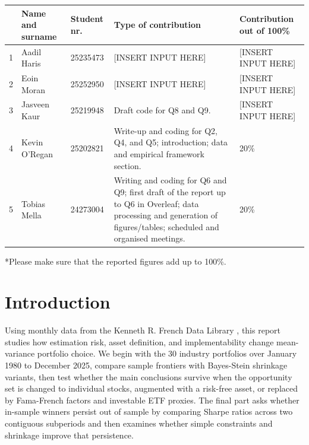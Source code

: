 \documentclass[11pt,a4paper]{article}
\begin{document}
\renewcommand{\arraystretch}{1.35}
\small
\begin{tabular}{|c|p{3.1cm}|p{2.2cm}|p{6.0cm}|p{2.3cm}|}
\hline
& \textbf{Name and surname} & \textbf{Student nr.} & \textbf{Type of contribution} & \textbf{Contribution out of 100\%} \\ \hline
1 & Aadil Haris & 25235473 & [INSERT INPUT HERE] & [INSERT INPUT HERE] \\ \hline
2 & Eoin Moran & 25252950 & [INSERT INPUT HERE] & [INSERT INPUT HERE] \\ \hline
3 & Jasveen Kaur & 25219948 & Draft code for Q8 and Q9. & [INSERT INPUT HERE] \\ \hline
4 & Kevin O'Regan & 25202821 & Write-up and coding for Q2, Q4, and Q5; introduction; data and empirical framework section. & 20\% \\ \hline
5 & Tobias Mella & 24273004 & Writing and coding for Q6 and Q9; first draft of the report up to Q6 in Overleaf; data processing and generation of figures/tables; scheduled and organised meetings. & 20\% \\ \hline
\end{tabular}

\vspace{0.5em}

\noindent
\footnotesize{*Please make sure that the reported figures add up to 100\%.}
\normalsize

\clearpage
{}
\hypersetup{pageanchor=true}
\thispagestyle{fancy}

\section*{Introduction}
Using monthly data from the Kenneth R. French Data Library \parencite{FrenchLibrary}, this report studies how estimation risk, asset definition, and implementability change mean-variance portfolio choice. We begin with the 30 industry portfolios over January 1980 to December 2025, compare sample frontiers with Bayes-Stein shrinkage variants, then test whether the main conclusions survive when the opportunity set is changed to individual stocks, augmented with a risk-free asset, or replaced by Fama-French factors and investable ETF proxies. The final part asks whether in-sample winners persist out of sample by comparing Sharpe ratios across two contiguous subperiods and then examines whether simple constraints and shrinkage improve that persistence.
\end{document}

